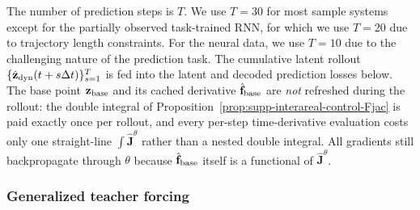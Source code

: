 The number of prediction steps is $T$. We use $T = 30$ for most sample systems except for the partially observed task-trained RNN, for which we use $T=20$ due to trajectory length constraints. For the neural data, we use $T=10$ due to the challenging nature of the prediction task. The cumulative latent rollout $\{\hat{\vb{z}}_{\mathrm{dyn}}(t+s\Delta t)\}_{s=1}^{T}$ is fed into the latent and decoded prediction losses below. The base point $\vb{z}_{\mathrm{base}}$ and its cached derivative $\hat{\vb{f}}_{\mathrm{base}}$ are \emph{not} refreshed during the rollout: the double integral of Proposition~\ref{prop:supp-interareal-control-Fjac} is paid exactly once per rollout, and every per-step time-derivative evaluation costs only one straight-line $\int\hat{\mathbf{J}}^{\theta}$ rather than a nested double integral. All gradients still backpropagate through $\theta$ because $\hat{\vb{f}}_{\mathrm{base}}$ itself is a functional of $\hat{\mathbf{J}}^{\theta}$.

\subsubsection{Generalized teacher forcing}\label{supp:interareal-control-gtf-impl}

